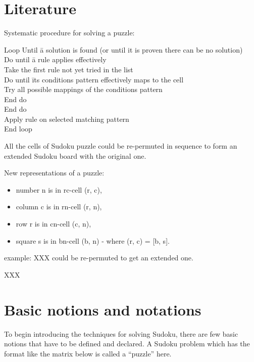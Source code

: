 \documentclass[11pt]{report}
\begin{document}
\section{Literature}
\label{sec:introLiterature}

Systematic procedure for solving a puzzle:
\begin{tabbing}
Loop Until \= a solution is found (or until it is proven there can be no solution) \\
\> Do until \= a rule applies  effectively \\
\> \> Take the first rule not yet tried in the list \\
\> \> Do until \= its conditions pattern effectively maps to the cell \\
\> \> \> Try all possible mappings of the conditions pattern \\
\> \> End do\\
\> End do\\
\> Apply rule on selected matching pattern \\
End loop\\
\end{tabbing}

All the cells of Sudoku puzzle could be re-permuted in sequence to form an extended Sudoku board with the original one.

New representations of a puzzle:
\begin{itemize}
\item number n is in rc-cell (r, c),
\item column c is in rn-cell (r, n),
\item row r is in cn-cell (c, n),
\item square s is in bn-cell (b, n) - where (r, c) = [b, s].
\end{itemize}

example: XXX could be re-permuted to get an extended one.

\cite{Berthier2007Sudoku} XXX





\section{Basic notions and notations}
\label{sec:basicnotnotat}

To begin introducing the techniques for solving Sudoku, there are few basic notions that have to be defined and declared.
A Sudoku problem which has the format like the matrix below is called a  ``puzzle'' here.
\end{document}
